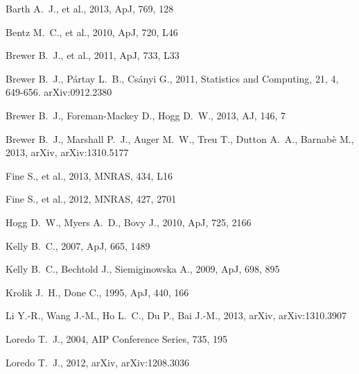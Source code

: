 \documentclass[useAMS,usenatbib]{mn2e}
\begin{document}
\begin{thebibliography}{99}
Barth A.~J., et al., 2013, ApJ, 769, 128 

Bentz M.~C., et al., 2010, ApJ, 720, L46 

Brewer B.~J., et al., 2011, ApJ, 733, L33 

 Brewer B.~J., P{\'a}rtay L.~B.,
Cs{\'a}nyi G., 2011, Statistics and Computing, 21, 4, 649-656. arXiv:0912.2380

 Brewer B.~J., Foreman-Mackey D., Hogg D.~W., 2013, AJ, 146, 7 

Brewer B.~J., Marshall P.~J., Auger M.~W., Treu T., Dutton A.~A., 
Barnab{\`e} M., 2013, arXiv, arXiv:1310.5177 

Fine S., et al., 2013, MNRAS, 434, L16 

Fine S., et al., 2012, MNRAS, 427, 2701 

 Hogg D.~W., Myers A.~D., Bovy J., 2010, ApJ, 725, 2166 

 Kelly 
B.~C., 2007, ApJ, 665, 1489 

 Kelly B.~C., Bechtold J.,
Siemiginowska A., 2009, ApJ, 698, 895 

 Krolik J.~H., Done C., 1995, ApJ, 440, 166 

 Li 
Y.-R., Wang J.-M., Ho L.~C., Du P., Bai J.-M., 2013, arXiv, arXiv:1310.3907 

 Loredo 
T.~J., 2004, AIP Conference Series, 735, 195 

 Loredo 
T.~J., 2012, arXiv, arXiv:1208.3036 


\end{thebibliography}
\end{document}
